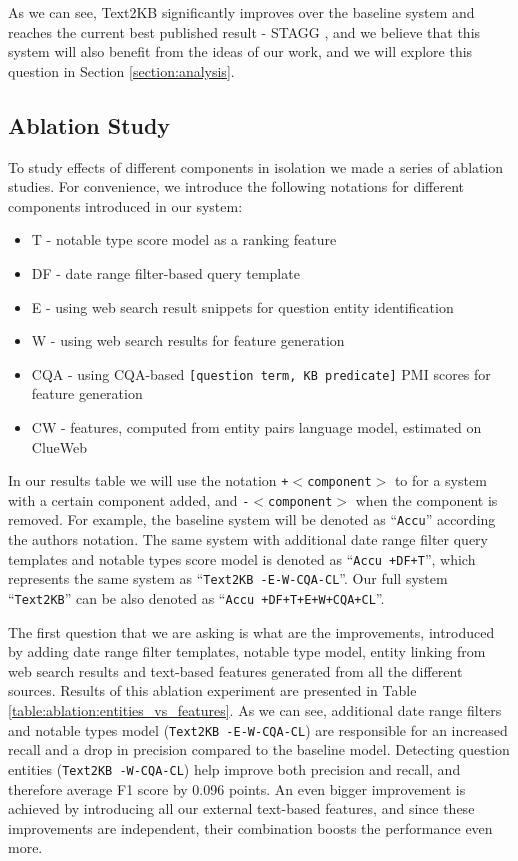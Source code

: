 As we can see, Text2KB significantly improves over the baseline system and reaches the current best published result - STAGG \cite{yih2015semantic}, and we believe that this system will also benefit from the ideas of our work, and we will explore this question in Section \ref{section:analysis}.

\subsection{Ablation Study}

To study effects of different components in isolation we made a series of ablation studies.
For convenience, we introduce the following notations for different components introduced in our system:
\vspace{-0.1cm}
\begin{itemize}
\setlength\itemsep{-0.5em}
\item T - notable type score model as a ranking feature
\item DF - date range filter-based query template
\item E - using web search result snippets for question entity identification
\item W - using web search results for feature generation
\item CQA - using CQA-based \texttt{[question term, KB predicate]} PMI scores for feature generation
\item CW - features, computed from entity pairs language model, estimated on ClueWeb
\end{itemize}

In our results table we will use the notation \texttt{+$<$component$>$} to for a system with a certain component added, and \texttt{-$<$component$>$} when the component is removed.
For example, the baseline system will be denoted as ``\texttt{Accu}'' according the authors notation.
The same system with additional date range filter query templates and notable types score model is denoted as ``\texttt{Accu +DF+T}'', which represents the same system as ``\texttt{Text2KB -E-W-CQA-CL}''.
Our full system ``\texttt{Text2KB}'' can be also denoted as ``\texttt{Accu +DF+T+E+W+CQA+CL}''.

The first question that we are asking is what are the improvements, introduced by adding date range filter templates, notable type model, entity linking from web search results and text-based features generated from all the different sources.
Results of this ablation experiment are presented in Table \ref{table:ablation:entities_vs_features}.
As we can see, additional date range filters and notable types model (\texttt{Text2KB -E-W-CQA-CL}) are responsible for an increased recall and a drop in precision compared to the baseline model.
Detecting question entities (\texttt{Text2KB -W-CQA-CL}) help improve both precision and recall, and therefore average F1 score by 0.096 points.
An even bigger improvement is achieved by introducing all our external text-based features, and since these improvements are independent, their combination boosts the performance even more.

